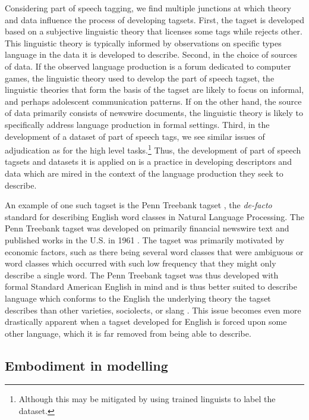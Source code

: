 Considering part of speech tagging, we find multiple junctions at which theory and data influence the process of developing tagsets. First, the tagset is developed based on a subjective linguistic theory that licenses some tags while rejects other. This linguistic theory is typically informed by observations on specific types language in the data it is developed to describe. Second, in the choice of sources of data. If the observed language production is a forum dedicated to computer games, the linguistic theory used to develop the part of speech tagset, the linguistic theories that form the basis of the tagset are likely to focus on informal, and perhaps adolescent communication patterns. If on the other hand, the source of data primarily consists of newswire documents, the linguistic theory is likely to specifically address language production in formal settings. Third, in the development of a dataset of part of speech tags, we see similar issues of adjudication as for the high level tasks.\footnote{Although this may be mitigated by using trained linguists to label the dataset.}
Thus, the development of part of speech tagsets and datasets it is applied on is a practice in developing descriptors and data which are mired in the context of the language production they seek to describe.

An example of one such tagset is the Penn Treebank tagset \cite{Marcus:1993}, the \textit{de-facto} standard for describing English word classes in Natural Language Processing. The Penn Treebank tagset was developed on primarily financial newswire text and published works in the U.S. in 1961 \cite{Francis:1982}. The tagset was primarily motivated by economic factors, such as there being several word classes that were ambiguous or word classes which occurred with such low frequency that they might only describe a single word. The Penn Treebank tagset was thus developed with formal Standard American English in mind and is thus better suited to describe language which conforms to the English the underlying theory the tagset describes than other varieties, sociolects, or slang \cite{Jorgensen:2016}.
This issue becomes even more drastically apparent when a tagset developed for English is forced upon some other language, which it is far removed from being able to describe.

\subsection{Embodiment in modelling}

